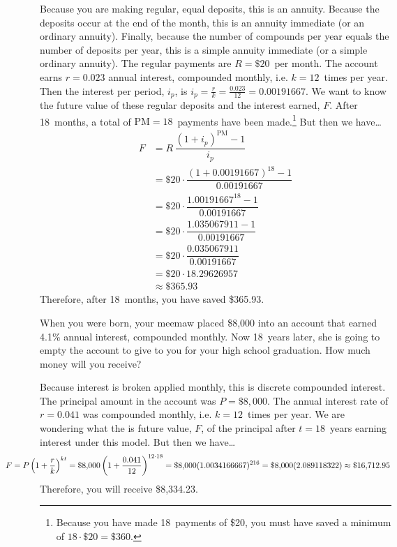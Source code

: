 \documentclass[12pt,letterpaper]{exam}
\begin{document}
\begin{questions}
\sol Because you are making regular, equal deposits, this is an annuity. Because the deposits occur at the end of the month, this is an annuity immediate (or an ordinary annuity). Finally, because the number of compounds per year equals the number of deposits per year, this is a simple annuity immediate (or a simple ordinary annuity). The regular payments are $R= \$20$~per month. The account earns $r= 0.023$ annual interest, compounded monthly, i.e. $k= 12$~times per year. Then the interest per period, $i_p$, is $i_p= \frac{r}{k}= \frac{0.023}{12}= 0.00191667$. We want to know the future value of these regular deposits and the interest earned, $F$. After 18~months, a total of $\text{PM}= 18$~payments have been made.\footnote{Because you have made 18~payments of \$20, you must have saved a minimum of $18 \cdot \$20= \$360$.} But then we have\dots
	\[
	\begin{aligned}
	F&= R\, \dfrac{(1 + i_p)^{\text{PM}} - 1}{i_p} \\[0.3cm]
	&= \$20 \cdot \dfrac{(1 + 0.00191667)^{18} - 1}{0.00191667} \\[0.3cm]
	&= \$20 \cdot \dfrac{1.00191667^{18} - 1}{0.00191667} \\[0.3cm]
	&= \$20 \cdot \dfrac{1.035067911 - 1}{0.00191667} \\[0.3cm]
	&= \$20 \cdot \dfrac{0.035067911}{0.00191667} \\[0.3cm]
	&= \$20 \cdot 18.29626957 \\[0.3cm]
	&\approx   \$365.93
	\end{aligned}
	\]
Therefore, after 18~months, you have saved \$365.93.



\newpage
\question[10] When you were born, your meemaw placed \$8,000 into an account that earned 4.1\% annual interest, compounded monthly. Now 18~years later, she is going to empty the account to give to you for your high school graduation. How much money will you receive? \pspace

\sol Because interest is broken applied monthly, this is discrete compounded interest. The principal amount in the account was $P= \$8,\!000$. The annual interest rate of $r= 0.041$ was compounded monthly, i.e. $k= 12$~times per year. We are wondering what the is future value, $F$, of the principal after $t= 18$~years earning interest under this model. But then we have\dots
	\[
	\hspace{-1.5cm} F= P \left(1 + \dfrac{r}{k} \right)^{kt}= \$8,\!000 \left(1 + \dfrac{0.041}{12} \right)^{12 \cdot 18}= \$8,\!000 (1.0034166667)^{216}= \$8,\!000 (2.089118322) \approx \$16,\!712.95
	\]
Therefore, you will receive \$8,334.23. 




\end{questions}
\end{document}
